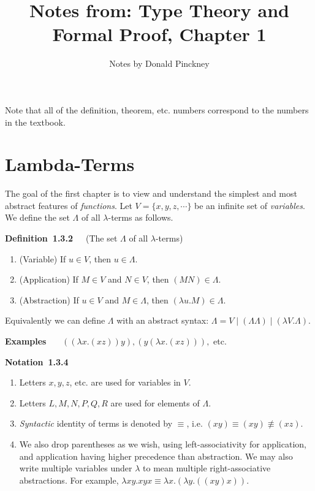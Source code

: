 \documentclass[letterpaper]{article}
\author{Notes by Donald Pinckney}
\title{Notes from: Type Theory and Formal Proof, Chapter 1}
\newenvironment{notation}[2][]{\par\medskip
	\noindent \textbf{Notation~#2}~~~#1 \rmfamily\em}{\medskip}
\newenvironment{examplesNonNum}[1][]{\par\medskip
	\noindent \textbf{Examples}~~~#1 \rmfamily}{\medskip}
\newenvironment{definition}[2][]{\par\medskip
	\noindent \textbf{Definition~#2}~~~#1 \rmfamily}{\medskip}
\begin{document}
\maketitle

Note that all of the definition, theorem, etc. numbers correspond to the numbers in the textbook.

\section{Lambda-Terms}

The goal of the first chapter is to view and understand the simplest and most abstract features of \emph{functions}. Let $V = \{x, y, z, \cdots\}$ be an infinite set of \emph{variables}. We define the set $\Lambda$ of all $\lambda$-terms as follows.

\begin{definition}[(The set $\Lambda$ of all $\lambda$-terms)]{1.3.2}
	\begin{enumerate}
		\item (Variable) If $u \in V$, then $u \in \Lambda$.
		\item (Application) If $M \in V$ and $N \in V$, then $(M N) \in \Lambda$.
		\item (Abstraction) If $u \in V$ and $M \in \Lambda$, then $(\lambda u.M) \in \Lambda$.
	\end{enumerate}
	Equivalently we can define $\Lambda$ with an abstract syntax: $\Lambda = V \mid (\Lambda \Lambda) \mid (\lambda V . \Lambda)$.
\end{definition}

\begin{examplesNonNum}
	$((\lambda x.(x z)) y), (y(\lambda x.(x z))), $ etc.
\end{examplesNonNum}

\begin{notation}{1.3.4}
	\begin{enumerate}
		\item Letters $x, y, z$, etc. are used for variables in $V$.
		\item Letters $L, M, N, P, Q, R$ are used for elements of $\Lambda$.
		\item \emph{Syntactic} identity of terms is denoted by $\equiv$, i.e. $(x y) \equiv (x y) \not \equiv (x z)$.
		\item We also drop parentheses as we wish, using left-associativity for application, and application having higher precedence than abstraction. We may also write multiple variables under $\lambda$ to mean multiple right-associative abstractions. For example, $\lambda xy.x y x \equiv \lambda x . (\lambda y. ((x y) x))$.
	\end{enumerate}
\end{notation}
\end{document}
